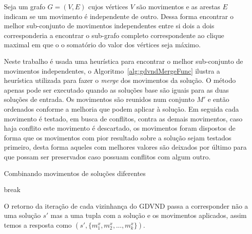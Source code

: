 Seja um grafo $G = (V, E)$ cujos vértices $V$ são movimentos e as arestas $E$ indicam se um movimento é independente de outro.
Dessa forma encontrar o melhor sub-conjunto de movimentos independentes entre si dois a dois corresponderia a encontrar o sub-grafo completo correspondente ao clique maximal em que o o somatório do valor dos vértices seja máximo.

Neste trabalho é usada uma heurística para encontrar o melhor sub-conjunto de movimentos independentes, o Algoritmo~\ref{alg:gdvndMergeFunc} ilustra a heurística utilizada para fazer o \emph{merge} dos movimentos da solução.
O método apenas pode ser executado quando as soluções base são iguais para as duas soluções de entrada.
Os movimentos são reunidos num conjunto $M'$ e então ordenados conforme a melhoria que podem aplicar à solução.
Em seguida cada movimento é testado, em busca de conflitos, contra as demais movimentos, caso haja conflito este movimento é descartado, os movimentos foram dispostos de forma que os movimentos com pior resultado sobre a solução sejam testados primeiro, desta forma aqueles com melhores valores são deixados por último para que possam ser preservados caso possuam conflitos com algum outro.

\begin{algorithm}[htpb]
\caption{Combinando movimentos de soluções diferentes}
\label{alg:gdvndMergeFunc}
\begin{algorithmic}[1]
         
             
                        \State break
                    \EndIf
                \EndFor
            \EndFor
        \EndIf
    \EndFunction
\end{algorithmic}
\end{algorithm}

O retorno da iteração de cada vizinhança do GDVND passa a corresponder não a uma solução $s'$ mas a uma tupla com a solução e os movimentos aplicados, assim temos a resposta como $(s', \{m_1^x, m_2^x, \dots, m_k^x\})$.

